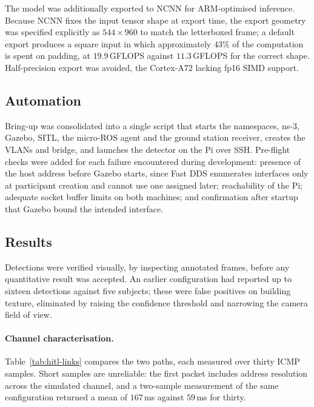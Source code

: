 The model was additionally exported to NCNN for ARM-optimised inference. Because
NCNN fixes the input tensor shape at export time, the export geometry was
specified explicitly as \(544 \times 960\) to match the letterboxed frame; a
default export produces a square input in which approximately \(43\%\) of the
computation is spent on padding, at \(19.9\)\,GFLOPS against \(11.3\)\,GFLOPS for
the correct shape. Half-precision export was avoided, the Cortex-A72 lacking fp16
SIMD support.

\subsection{Automation}
\label{sec:hitl-automation}

Bring-up was consolidated into a single script that starts the namespaces, ns-3,
Gazebo, SITL, the micro-ROS agent and the ground station receiver, creates the
VLANs and bridge, and launches the detector on the Pi over SSH. Pre-flight checks
were added for each failure encountered during development: presence of the host
address before Gazebo starts, since Fast DDS enumerates interfaces only at
participant creation and cannot use one assigned later; reachability of the Pi;
adequate socket buffer limits on both machines; and confirmation after startup
that Gazebo bound the intended interface.

\subsection{Results}
\label{sec:hitl-results}

Detections were verified visually, by inspecting annotated frames, before any
quantitative result was accepted. An earlier configuration had reported up to
sixteen detections against five subjects; these were false positives on building
texture, eliminated by raising the confidence threshold and narrowing the camera
field of view.

\paragraph{Channel characterisation.}
Table~\ref{tab:hitl-links} compares the two paths, each measured over thirty ICMP
samples. Short samples are unreliable: the first packet includes address
resolution across the simulated channel, and a two-sample measurement of the same
configuration returned a mean of \(167\)\,ms against \(59\)\,ms for thirty.

